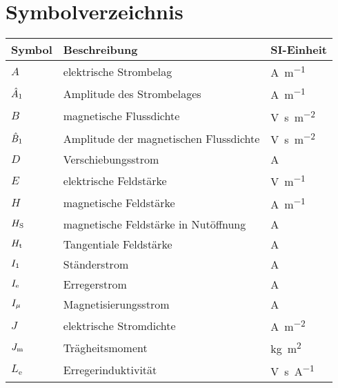 

\chapter*{Symbolverzeichnis}\label{s.sym}
\begin{flushleft}
\begin{tabularx}{\textwidth}{lll}
\toprule
Symbol & Beschreibung	& SI-Einheit\\
\midrule
$A$			&	elektrische Strombelag  	&  	\si{\ampere\per\meter} \\
$\hat{A}_{\mathrm{1}}$			&	Amplitude des Strombelages  	&  	\si{\ampere\per\meter} \\ 
$B$			&	magnetische Flussdichte		&	\si{\volt\second\per\square\meter} \\
$\hat{B}_{\mathrm{1}}$	 &	Amplitude der magnetischen Flussdichte 	&  	\si{\volt\second\per\square\meter} \\ 
$D$ & Verschiebungsstrom &  \si{\ampere} \\
$E$ & elektrische Feldstärke & \si{\volt\per\meter} \\
$H$			&	magnetische Feldstärke		&	\si{\ampere\per\meter}\\
$H_{\mathrm{S}}$	&   magnetische Feldstärke in Nutöffnung	&	\si{\ampere} \\
$H_{\mathrm{t}}$	&   Tangentiale Feldstärke	&	\si{\ampere} \\
$I_{\mathrm{1}}$	&	Ständerstrom	&	\si{\ampere} \\
$I_{\mathrm{e}}$	&	Erregerstrom	&	\si{\ampere} \\
$I_{\mathrm{\mu}}$	&	Magnetisierungsstrom	&	\si{\ampere} \\
$J$			&	elektrische Stromdichte		&	\si{\ampere\per\square\meter} \\
$J_{\mathrm{m}}$			&	Trägheitsmoment	&	\si{\kilogram\square\meter} \\
$L_\mathrm{e}$	& 	Erregerinduktivität & \si{\volt\second\per\ampere}\\

\end{tabularx}
\end{flushleft}
